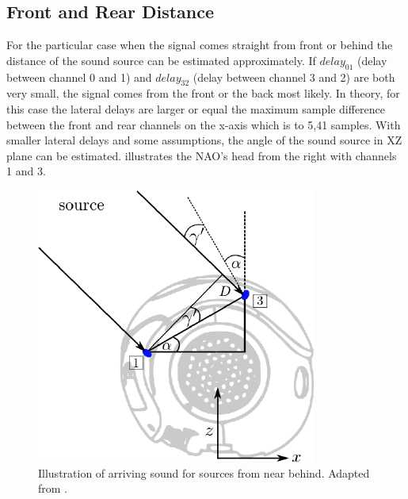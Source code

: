 \subsection{Front and Rear Distance}
\label{subsec:03_distance}


For the particular case when the signal comes straight from front or behind
the distance of the sound source can be estimated approximately.
If $delay_{01}$ (delay between channel 0 and 1) and $delay_{32}$ (delay between channel 3 and 2)
are both very small, the signal comes from
the front or the back most likely.
In theory, for this case the lateral delays are larger or equal the maximum
sample difference between the front and rear channels on the x-axis which is
to 5,41 samples.
With smaller lateral delays and some assumptions, the angle of the sound source in XZ
plane can be estimated.
 illustrates the NAO's head from the right with
channels 1 and 3.
\begin{figure}[ht]
	\centering
		\includegraphics[width=0.45\columnwidth]{figures/side_head_tdoa}
    \caption{Illustration of arriving sound for sources from near behind.
             Adapted from \cite{nao_docu}.}
    \label{fig:02_headSideTdoa}
\end{figure}

